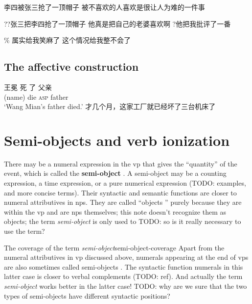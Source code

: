 \documentclass[UTF8, a4paper, oneside, scheme=plain]{ctexrep}
\newcommand*{\citesec}[1]{\S~{#1}}
\newcommand*{\citepage}[1]{p.~{#1}}
\newcommand*{\concept}[1]{\textbf{#1}}
\newcommand*{\term}[1]{\emph{#1}}
\newcommand{\translate}[1]{`#1'}
\newcommand*{\category}[1]{\textsc{#1}}
\begin{document}
\begin{exe}
    \ex 李四被张三抢了一顶帽子
    \ex 被不喜欢的人喜欢是很让人为难的一件事
\end{exe}

\begin{exe}
    \ex ??张三把李四抢了一顶帽子
    \ex *他真是把自己的老婆喜欢啊
    \ex ?他把我批评了一番
\end{exe}

\begin{exe}
    \ex \% 属实给我笑麻了
    \ex 这个情况给我整不会了
\end{exe}

\subsection{The affective construction}

\begin{exe}
    \ex \gll 王冕 死 了 父亲 \\
    (name) die \category{asp} father \\
    \glt \translate{Wang Mian's father died.}
    \ex 才几个月，这家工厂就已经坏了三台机床了
\end{exe}

\section{Semi-objects and verb ionization}\label{sec:verb-splitting}

There may be a numeral expression in the \acs{vp}
that gives the ``quantity'' of the event, 
which is called the \concept{semi-object} 
\citep[\citesec{8.6}]{zhudexigrammar}.
A semi-object may be a counting expression, 
a time expression, 
or a pure numerical expression (TODO: examples, and more concise terms).
Their syntactic and semantic functions 
are closer to numeral attributives in \acs{np}s.
They are called ``objects '' purely because they are within the \acs{vp}
and are \acs{np}s themselves;
this note doesn't recognize them as objects;
the term \term{semi-object} is only used to TODO: so is it really necessary to use the term?

\begin{infobox}{The coverage of the term \term{semi-object}}{semi-object-coverage}
    Apart from the numeral attributives in \acs{vp} discussed above, 
    numerals appearing at the end of \acs{vp}s 
    are also sometimes called semi-objects \citep[\citepage{117}]{deng2010formal}.
    The syntactic function numerals in this latter case 
    is closer to verbal complements (TODO: ref).
    And actually the term \term{semi-object} works better in the latter case!
    TODO: why are we sure that the two types of semi-objects have different syntactic positions?
\end{infobox}
\end{document}
